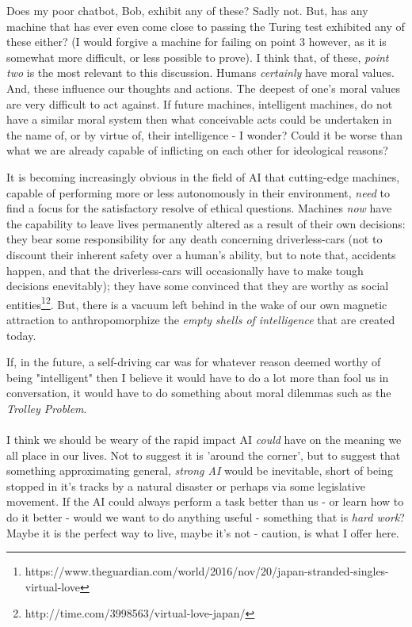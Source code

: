 \documentclass[]{article}
\begin{document}
\noindent
Does my poor chatbot, Bob, exhibit any of these? Sadly not. But, has any machine that has ever even come close to passing the Turing test exhibited any of these either? (I would forgive a machine for failing on point 3 however, as it is somewhat more difficult, or less possible to prove).
I think that, of these, \emph{point two} is the most relevant to this discussion. Humans \emph{certainly} have moral values. And, these influence our thoughts and actions. The deepest of one's moral values are very difficult to act against. If future machines, intelligent machines, do not have a similar moral system then what conceivable acts could be undertaken in the name of, or by virtue of, their intelligence - I wonder? Could it be worse than what we are already capable of inflicting on each other for ideological reasons?

It is becoming increasingly obvious in the field of AI that cutting-edge machines, capable of performing more or less autonomously in their environment, \emph{need} to find a focus for the satisfactory resolve of ethical questions. Machines \emph{now} have the capability to leave lives permanently altered as a result of their own decisions: they bear some responsibility for any death concerning driverless-cars (not to discount their inherent safety over a human's ability, but to note that, accidents happen, and that the driverless-cars will occasionally have to make tough decisions enevitably); they have some convinced that they are worthy as social entities\footnote{https://www.theguardian.com/world/2016/nov/20/japan-stranded-singles-virtual-love}\footnote{http://time.com/3998563/virtual-love-japan/}. But, there is a vacuum left behind in the wake of our own magnetic attraction to anthropomorphize the \emph{empty shells of intelligence} that are created today.

If, in the future, a self-driving car was for whatever reason deemed worthy of being "intelligent" then I believe it would have to do a lot more than fool us in conversation, it would have to do something about moral dilemmas such as the \emph{Trolley Problem}.
\\\\

I think we should be weary of the rapid impact AI \emph{could} have on the meaning we all place in our lives. Not to suggest it is 'around the corner', but to suggest that something approximating general, \emph{strong AI} would be inevitable, short of being stopped in it's tracks by a natural disaster or perhaps via some legislative movement. If the AI could always perform a task better than us - or learn how to do it better - would we want to do anything useful - something that is \emph{hard work}? Maybe it is the perfect way to live, maybe it's not - caution, is what I offer here.
\end{document}
